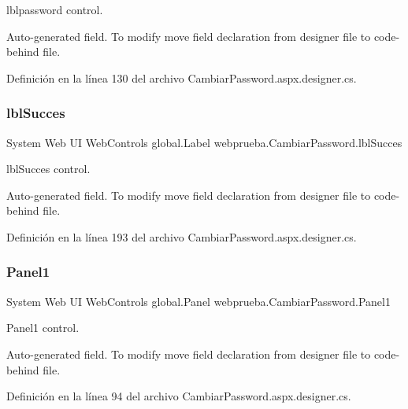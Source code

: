 lblpassword control. 

Auto-\/generated field. To modify move field declaration from designer file to code-\/behind file. 

Definición en la línea 130 del archivo Cambiar\+Password.\+aspx.\+designer.\+cs.

\mbox{\label{classwebprueba_1_1_cambiar_password_a1600f4e59eaffb66e7bb51a4b8a38389}} 
\subsubsection{\texorpdfstring{lblSucces}{lblSucces}}
{\footnotesize\ttfamily System Web UI Web\+Controls global.\+Label webprueba.\+Cambiar\+Password.\+lbl\+Succes\hspace{0.3cm}{\ttfamily [protected]}}



lbl\+Succes control. 

Auto-\/generated field. To modify move field declaration from designer file to code-\/behind file. 

Definición en la línea 193 del archivo Cambiar\+Password.\+aspx.\+designer.\+cs.

\mbox{\label{classwebprueba_1_1_cambiar_password_ac4473c985a1ebb7d5f7fe56bcac1c86c}} 
\subsubsection{\texorpdfstring{Panel1}{Panel1}}
{\footnotesize\ttfamily System Web UI Web\+Controls global.\+Panel webprueba.\+Cambiar\+Password.\+Panel1\hspace{0.3cm}{\ttfamily [protected]}}



Panel1 control. 

Auto-\/generated field. To modify move field declaration from designer file to code-\/behind file. 

Definición en la línea 94 del archivo Cambiar\+Password.\+aspx.\+designer.\+cs.



